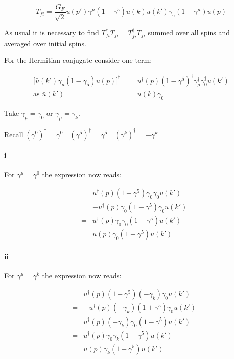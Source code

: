 \[
  T_{fi} = \frac{G_F}{\sqrt{2}}\bar{u}(p')\gamma^{\mu}\left(1 - \gamma^5\right)u(k)\bar{u}(k')\gamma_{\gamma}\left(1 - \gamma^{\mu}\right)u(p)
\]

As usual it is necessary to find $T_{fi}^* T_{fi} = T_{fi}^{\dagger}T_{fi}$ summed over all spins and averaged over initial spins.

For the Hermitian conjugate consider one term:

\begin{eqnarray*}
  \Big[ \bar{u}(k')\gamma_{\mu}\left(1 - \gamma_5\right) u(p)\Big]^{\dagger} & = & u^{\dagger}(p)\left(1 - \gamma^5\right)^{\dagger}\gamma_{\mu}^{\dagger}\gamma_0^{\dagger}u(k') \\
  \textrm{as } \bar{u}(k') & = & u(k)\gamma_0
\end{eqnarray*}

Take $\gamma_{\mu} = \gamma_0$ or $\gamma_{\mu} = \gamma_k$.

Recall $\left(\gamma^0\right)^{\dagger} = \gamma^0 \quad \left(\gamma^5\right)^{\dagger} = \gamma^5 \quad \left(\gamma^k\right)^{\dagger} = -\gamma^k$

\paragraph{i} For $\gamma^{\mu} = \gamma^0$ the expression now reads:

\begin{eqnarray*}
  && u^{\dagger}(p)\left(1 - \gamma^5\right)\gamma_0\gamma_0u(k') \\
  & = & -u^{\dagger}(p)\gamma_0\left(1 - \gamma^5\right)\gamma_0u(k') \\
  & = & u^{\dagger}(p)\gamma_0\gamma_0\left(1 - \gamma^5\right)u(k') \\
  & = & \bar{u}(p)\gamma_0\left(1 - \gamma^5\right)u(k')
\end{eqnarray*}

\paragraph{ii} For $\gamma^{\mu} = \gamma^{k}$ the expression now reads:

\begin{eqnarray*}
  && u^{\dagger}(p)\left(1 - \gamma^5\right)\left(-\gamma_k\right)\gamma_0u(k') \\
  & = & -u^{\dagger}(p)(-\gamma_k)\left(1 + \gamma^5\right)\gamma_0 u(k') \\
  & = & u^{\dagger}(p)(-\gamma_k)\gamma_0\left(1 - \gamma^5\right)u(k') \\
  & = & u^{\dagger}(p)\gamma_0\gamma_k\left(1 - \gamma^5\right)u(k') \\
  & = & \bar{u}(p)\gamma_k\left(1 - \gamma^5\right)u(k')
\end{eqnarray*}

